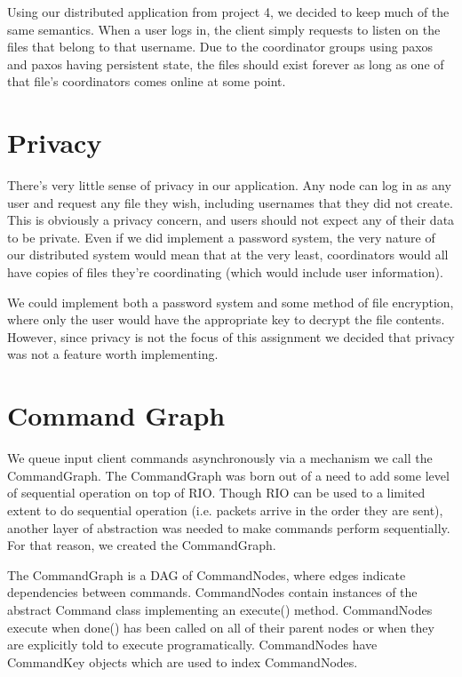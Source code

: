 \documentclass[11pt]{article}
\begin{document}
Using our distributed application from project 4, we decided to keep much of the same semantics. When a user logs in, the client simply requests to listen on the files that belong to that username. Due to the coordinator groups using paxos and paxos having persistent state, the files should exist forever as long as one of that file's coordinators comes online at some point.

\section{Privacy}

There's very little sense of privacy in our application. Any node can log in as any user and request any file they wish, including usernames that they did not create. This is obviously a privacy concern, and users should not expect any of their data to be private. Even if we did implement a password system, the very nature of our distributed system would mean that at the very least, coordinators would all have copies of files they're coordinating (which would include user information). 

We could implement both a password system and some method of file encryption, where only the user would have the appropriate key to decrypt the file contents. However, since privacy is not the focus of this assignment we decided that privacy was not a feature worth implementing. 

\section{Command Graph}

We queue input client commands asynchronously  via a mechanism we call the CommandGraph. The CommandGraph was born out of a need to add some level of sequential operation on top of RIO. Though RIO can be used to a limited extent to do sequential operation (i.e. packets arrive in the order they are sent), another layer of abstraction was needed to make commands perform sequentially. For that reason, we created the CommandGraph.

The CommandGraph is a DAG of CommandNodes, where edges indicate dependencies between commands.
CommandNodes contain instances of the abstract Command class implementing an execute() method.
CommandNodes execute when done() has been called on all of their parent nodes or when they are explicitly told to execute programatically.
CommandNodes have CommandKey objects which are used to index CommandNodes.
\end{document}

